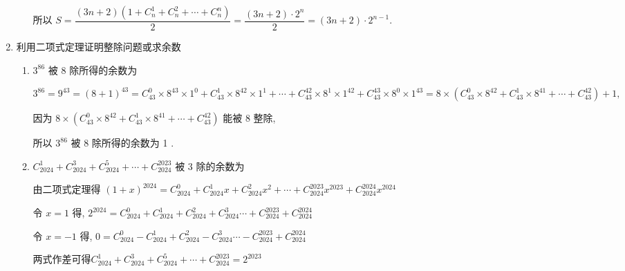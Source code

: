 \begin{enumerate}
\begin{enumerate}
\begin{jieda}
            所以 $S = \dfrac{\left( {{3n} + 2}\right) \left( {1 + {{C}}_{n}^{1} + {{C}}_{n}^{2} + \cdots  + {{C}}_{n}^{n}}\right) }{2} = \dfrac{\left( {{3n} + 2}\right)  \cdot  {2}^{n}}{2} = \left( {{3n} + 2}\right)  \cdot  {2}^{n - 1}$.
        \end{jieda}
    \end{enumerate}
    \item 利用二项式定理证明整除问题或求余数
    \begin{enumerate}
        \item $3^{86}$ 被 8 除所得的余数为
        \begin{jieda}
            ${3}^{86} = {9}^{43} = {\left( 8 + 1\right) }^{43} = {{C}}_{43}^{0} \times  {8}^{43} \times  {1}^{0} + {{C}}_{43}^{1} \times  {8}^{42} \times  {1}^{1} + \cdots  + {{C}}_{43}^{42} \times  {8}^{1} \times  {1}^{42} + {{C}}_{43}^{43} \times  {8}^{0} \times  {1}^{43}  = 8 \times  \left( {{{C}}_{43}^{0} \times  {8}^{42} + {{C}}_{43}^{1} \times  {8}^{41} + \cdots  + {{C}}_{43}^{42}}\right)  + 1,$
            
            因为 $8 \times  \left( {{{C}}_{43}^{0} \times  {8}^{42} + {{C}}_{43}^{1} \times  {8}^{41} + \cdots  + {{C}}_{43}^{42}}\right)$ 能被 8 整除,
            
            所以 ${3}^{86}$ 被 8 除所得的余数为 1 .
        \end{jieda}
        
        \item ${{C}}_{2024}^{1} + {{C}}_{2024}^{3} + {{C}}_{2024}^{5} + \cdots  + {{C}}_{2024}^{2023}$ 被 3 除的余数为
        \begin{jieda}
            由二项式定理得 ${\left( 1 + x\right) }^{2024} = {{C}}_{2024}^{0} + {{C}}_{2024}^{1}x + {{C}}_{2024}^{2}{x}^{2} + \cdots  + {{C}}_{2024}^{2023}{x}^{2023} + {{C}}_{2024}^{2024}{x}^{2024}$
            
            令 $x = 1$ 得, ${2}^{2024} = {{C}}_{2024}^{0} + {{C}}_{2024}^{1} + {{C}}_{2024}^{2} + {{C}}_{2024}^{3}\cdots  + {{C}}_{2024}^{2023} + {{C}}_{2024}^{2024}$
            
            令 $x =  - 1$ 得, $0 = {{C}}_{2024}^{0} - {{C}}_{2024}^{1} + {{C}}_{2024}^{2} - {{C}}_{2024}^{3}\cdots  - {{C}}_{2024}^{2023} + {{C}}_{2024}^{2024}$
            
            两式作差可得${{C}}_{2024}^{1} + {{C}}_{2024}^{3} + {{C}}_{2024}^{5} + \cdots  + {{C}}_{2024}^{2023} = {2}^{2023}$
            

\end{jieda}
\end{enumerate}
\end{enumerate}
